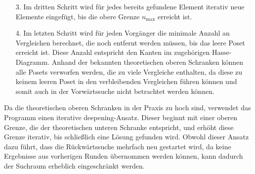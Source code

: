 \documentclass[10pt,journal,compsoc]{IEEEtran}
\begin{document}
\begin{itemize}
    \begin{proof} \label{proof:remove_only_last_element_edge}
      Angenommen, es existiert ein Vorgänger mit $n + 1$ Elementen, bei dem das $(n + 1)$-te Element wegreduziert werden kann, wenn ein Vergleich zwischen dem $i$-ten und dem $j$-ten Element eingefügt wird, wobei $0 \leq i < j \leq n$.
      Dann ... %
    \end{proof}

    Anschließend werden die Posets aus dem 1. und 2. Schritt in einer Menge zusammengeführt und es wird sichergestellt, dass alle Posets kanonisiert sind.

  \item[3.]
    Im dritten Schritt wird für jedes bereits gefundene Element iterativ neue Elemente eingefügt, bis die obere Grenze $n_{\text{max}}$ erreicht ist.



  \item[4.]
    Im letzten Schritt wird für jeden Vorgänger die minimale Anzahl an Vergleichen berechnet, die noch entfernt werden müssen, bis das leere Poset erreicht ist.
    Diese Anzahl entspricht den Kanten im zugehörigen Hasse-Diagramm.
    Anhand der bekannten theoretischen oberen Schranken können alle Posets verworfen werden, die zu viele Vergleiche enthalten, da diese zu keinem leeren Poset in den verbleibenden Vergleichen führen können und somit auch in der Vorwärtssuche nicht betrachtet werden können.
\end{itemize}

Da die theoretischen oberen Schranken in der Praxis zu hoch sind, verwendet das Programm einen iterative deepening-Ansatz.
Dieser beginnt mit einer oberen Grenze, die der theoretischen unteren Schranke entspricht, und erhöht diese Grenze iterativ, bis schließlich eine Lösung gefunden wird.
Obwohl dieser Ansatz dazu führt, dass die Rückwärtssuche mehrfach neu gestartet wird, da keine Ergebnisse aus vorherigen Runden übernommen werden können, kann dadurch der Suchraum erheblich eingeschränkt werden.
\end{document}
